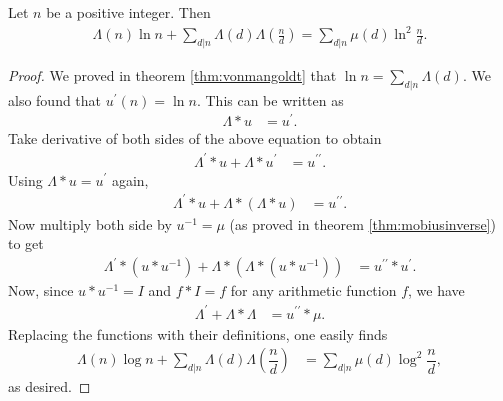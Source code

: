 \documentclass{subfile}
\begin{document}
	\begin{theorem}
		Let $n$ be a positive integer. Then
			\begin{align*}
				\Lambda(n)\ln n+\sum_{d|n}\Lambda(d)\Lambda\left(\frac nd\right)=\sum_{d|n}\mu(d)\ln^2\frac nd.
			\end{align*}
	\end{theorem}
	\begin{proof}
		We proved in theorem \eqref{thm:vonmangoldt} that $\ln n=\sum_{d|n}\Lambda(d)$. We also found that $u^\prime(n) = \ln n$. This can be written as
			\begin{align*}
				\Lambda\ast u & =u^\prime.
			\end{align*}
		Take derivative of both sides of the above equation to obtain
			\begin{align*}
				\Lambda^\prime\ast u+\Lambda\ast u^\prime & =u^{\prime\prime}.
			\end{align*}
		Using $\Lambda\ast u  =u^\prime$ again,
			\begin{align*}
				\Lambda^\prime\ast u+\Lambda\ast(\Lambda\ast u) & =u^{\prime\prime}.
			\end{align*}
		Now multiply both side by $u^{-1}=\mu$ (as proved in theorem \eqref{thm:mobiusinverse}) to get
			\begin{align*}
				\Lambda^\prime\ast(u\ast u^{-1})+\Lambda\ast(\Lambda\ast(u\ast u^{-1}))
					& =u^{\prime\prime}\ast u^\prime.
			\end{align*}
		Now, since $u \ast u^{-1} = I$ and $f \ast I = f$ for any arithmetic function $f$, we have
			\begin{align*}
				\Lambda^\prime+\Lambda\ast\Lambda & =u^{\prime\prime}\ast\mu.
			\end{align*}
		Replacing the functions with their definitions, one easily finds
			\begin{align*}
				\Lambda(n)\log n+\sum_{d|n}\Lambda(d)\Lambda\left(\dfrac nd\right) & =\sum_{d|n}\mu(d)\log^2\dfrac nd,
			\end{align*}
		as desired.
	\end{proof}
\end{document}
